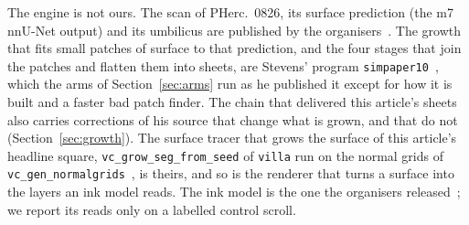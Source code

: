 The engine is not ours. The scan of PHerc.~0826, its surface prediction (the m7 nnU-Net output) and its umbilicus are
published by the organisers~\cite{opendata}. The growth that fits small patches of surface to that prediction, and the
four stages that join the patches and flatten them into sheets, are Stevens' program \texttt{simpaper10}~\cite{stevenssr},
which the arms of Section~\ref{sec:arms} run as he published it except for how it is built and a faster bad patch
finder. The chain that delivered this article's sheets also carries \CorrOutput{} corrections of his source that change
what is grown, and \CorrInert{} that do not (Section~\ref{sec:growth}). The surface tracer that grows the surface of this
article's headline square, \texttt{vc\_grow\_seg\_from\_seed} of \texttt{villa} run on the normal grids of
\texttt{vc\_gen\_normalgrids}~\cite{villa}, is theirs, and so is the renderer that turns a surface into the layers an ink
model reads. The ink model is the one the organisers released~\cite{inkmodel}; we report its reads only on a labelled
control scroll.

